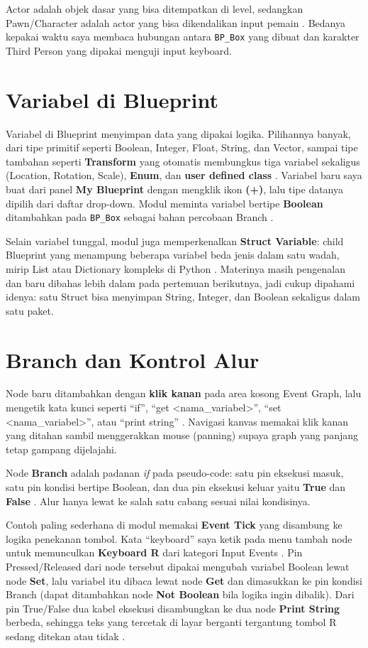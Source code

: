 \documentclass[a4paper,oneside,12pt]{report}
\begin{document}
Actor adalah objek dasar yang bisa ditempatkan di level, sedangkan Pawn/Character adalah actor yang bisa dikendalikan input pemain \cite{epic-actors}. Bedanya kepakai waktu saya membaca hubungan antara \texttt{BP\_Box} yang dibuat dan karakter Third Person yang dipakai menguji input keyboard.

\section{Variabel di Blueprint}
Variabel di Blueprint menyimpan data yang dipakai logika. Pilihannya banyak, dari tipe primitif seperti Boolean, Integer, Float, String, dan Vector, sampai tipe tambahan seperti \textbf{Transform} yang otomatis membungkus tiga variabel sekaligus (Location, Rotation, Scale), \textbf{Enum}, dan \textbf{user defined class} \cite{modul3,epic-variables}. Variabel baru saya buat dari panel \textbf{My Blueprint} dengan mengklik ikon \textbf{(+)}, lalu tipe datanya dipilih dari daftar drop-down. Modul meminta variabel bertipe \textbf{Boolean} ditambahkan pada \texttt{BP\_Box} sebagai bahan percobaan Branch \cite{modul3}.

Selain variabel tunggal, modul juga memperkenalkan \textbf{Struct Variable}: child Blueprint yang menampung beberapa variabel beda jenis dalam satu wadah, mirip List atau Dictionary kompleks di Python \cite{modul3}. Materinya masih pengenalan dan baru dibahas lebih dalam pada pertemuan berikutnya, jadi cukup dipahami idenya: satu Struct bisa menyimpan String, Integer, dan Boolean sekaligus dalam satu paket.

\section{Branch dan Kontrol Alur}
Node baru ditambahkan dengan \textbf{klik kanan} pada area kosong Event Graph, lalu mengetik kata kunci seperti ``if'', ``get \textless nama\_variabel\textgreater'', ``set \textless nama\_variabel\textgreater'', atau ``print string'' \cite{modul3}. Navigasi kanvas memakai klik kanan yang ditahan sambil menggerakkan mouse (panning) supaya graph yang panjang tetap gampang dijelajahi.

Node \textbf{Branch} adalah padanan \textit{if} pada pseudo-code: satu pin eksekusi masuk, satu pin kondisi bertipe Boolean, dan dua pin eksekusi keluar yaitu \textbf{True} dan \textbf{False} \cite{modul3,epic-flow}. Alur hanya lewat ke salah satu cabang sesuai nilai kondisinya.

Contoh paling sederhana di modul memakai \textbf{Event Tick} yang disambung ke logika penekanan tombol. Kata ``keyboard'' saya ketik pada menu tambah node untuk memunculkan \textbf{Keyboard R} dari kategori Input Events \cite{epic-input}. Pin Pressed/Released dari node tersebut dipakai mengubah variabel Boolean lewat node \textbf{Set}, lalu variabel itu dibaca lewat node \textbf{Get} dan dimasukkan ke pin kondisi Branch (dapat ditambahkan node \textbf{Not Boolean} bila logika ingin dibalik). Dari pin True/False dua kabel eksekusi disambungkan ke dua node \textbf{Print String} berbeda, sehingga teks yang tercetak di layar berganti tergantung tombol R sedang ditekan atau tidak \cite{modul3}.
\end{document}

